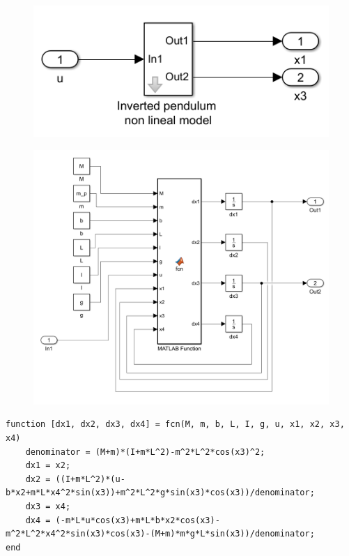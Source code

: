 \documentclass{ieeeaccess}
\begin{document}
\begin{figure}[h!]
\centering
\includegraphics[scale=1]{diagrama_bloques.PNG}
\label{diagramabloques}
\end{figure}

\begin{figure}[h!]
\centering
\includegraphics[scale=0.6]{diagrama_bloques_subsistema.PNG}
\label{subsistema}
\end{figure}


\lstset{language=Matlab, breaklines=true, basicstyle=\footnotesize}
\lstset{numbers=left, numberstyle=\tiny, stepnumber=1, numbersep=-2pt}
\begin{lstlisting}[frame=single]
function [dx1, dx2, dx3, dx4] = fcn(M, m, b, L, I, g, u, x1, x2, x3, x4)
    denominator = (M+m)*(I+m*L^2)-m^2*L^2*cos(x3)^2;
    dx1 = x2;
    dx2 = ((I+m*L^2)*(u-b*x2+m*L*x4^2*sin(x3))+m^2*L^2*g*sin(x3)*cos(x3))/denominator;
    dx3 = x4;
    dx4 = (-m*L*u*cos(x3)+m*L*b*x2*cos(x3)-m^2*L^2*x4^2*sin(x3)*cos(x3)-(M+m)*m*g*L*sin(x3))/denominator;
end
\end{lstlisting}
\end{document}
